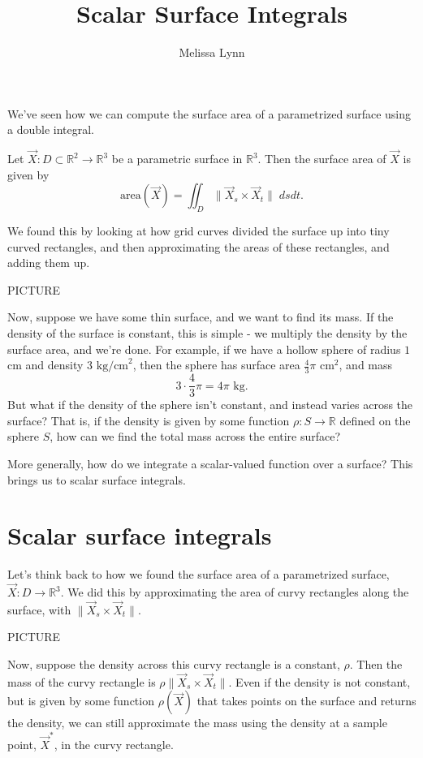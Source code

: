 \documentclass{ximera}
\title{Scalar Surface Integrals}
\author{Melissa Lynn}
\begin{document}
  
\begin{abstract}  
\end{abstract}  
\maketitle  

We've seen how we can compute the surface area of a parametrized surface using a double integral.

\begin{proposition}
Let $\vec{X}:D\subset\mathbb{R}^2\rightarrow\mathbb{R}^3$ be a parametric surface in $\mathbb{R}^3$. Then the surface area of $\vec{X}$ is given by
\[
\text{area}(\vec{X}) = \iint_D\|\vec{X}_s\times\vec{X}_t\|\;dsdt.
\]
\end{proposition}

We found this by looking at how grid curves divided the surface up into tiny curved rectangles, and then approximating the areas of these rectangles, and adding them up.

PICTURE

Now, suppose we have some thin surface, and we want to find its mass. If the density of the surface is constant, this is simple - we multiply the density by the surface area, and we're done. For example, if we have a hollow sphere of radius $1$ cm and density $3 \text{ kg/cm}^2$, then the sphere has surface area $\frac{4}{3}\pi \text{ cm}^2$, and mass
\[
3\cdot \frac{4}{3}\pi  = 4\pi\text{ kg}.
\]
But what if the density of the sphere isn't constant, and instead varies across the surface? That is, if the density is given by some function $\rho:S\rightarrow\mathbb{R}$ defined on the sphere $S$, how can we find the total mass across the entire surface?

More generally, how do we integrate a scalar-valued function over a surface? This brings us to scalar surface integrals.

\section*{Scalar surface integrals}

Let's think back to how we found the surface area of a parametrized surface, $\vec{X}:D\rightarrow\mathbb{R}^3$. We did this by approximating the area of curvy rectangles along the surface, with $\|\vec{X}_s\times\vec{X}_t\|$.

PICTURE

Now, suppose the density across this curvy rectangle is a constant, $\rho$. Then the mass of the curvy rectangle is $\rho\|\vec{X}_s\times\vec{X}_t\|$. Even if the density is not constant, but is given by some function $\rho(\vec{X})$ that takes points on the surface and returns the density, we can still approximate the mass using the density at a sample point, $\vec{X}^*$, in the curvy rectangle.
\end{document}
